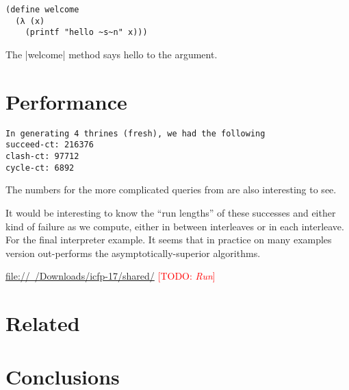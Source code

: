 \documentclass[screen,anonymous,review,draft,natbib=false]{acmart} %
\newcommand{\meta}[2]{[\textsc{#1}: \emph{#2}]}
\newcommand{\todo}[1]{\textcolor{red}{\meta{TODO}{#1}}}
\begin{document}
\begin{listing}
\begin{verbatim}  
(define welcome
  (λ (x)
    (printf "hello ~s~n" x)))
\end{verbatim}
\caption{The \rackinline|welcome| method says hello to the argument.}
\label{mnt:welcome}
\end{listing}

\section{Performance}\label{sec:performance}

\begin{verbatim}
In generating 4 thrines (fresh), we had the following
succeed-ct: 216376
clash-ct: 97712
cycle-ct: 6892
\end{verbatim}


The numbers for the more complicated queries from
\citet{byrd2017unifiedapproach} are also interesting to see.

It would be interesting to know the ``run lengths'' of these successes
and either kind of failure as we compute, either in between
interleaves or in each interleave. For the \citet{byrd2017unifiedapproach}
final interpreter example. It seems that in practice on many examples
 version out-performs the
asymptotically-superior algorithms.

\href{file://~/Downloads/icfp-17/shared/}{file://~/Downloads/icfp-17/shared/}
\todo{Run}

\section{Related}\label{sec:related}


\section{Conclusions}\label{sec:conclusions}



\printbibliography{}
\end{document}
